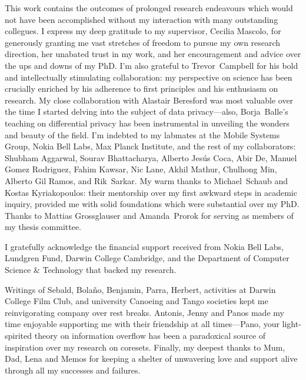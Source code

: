 
\begin{acknowledgements}
This work contains the outcomes of prolonged research endeavours which would not have been accomplished without my interaction with many outstanding collegues. I express my deep gratitude to my supervisor, Cecilia Mascolo, for generously granting me vast stretches of freedom to pursue my own research direction, her unabated trust in my work, and her encouragement and advice over the ups and downs of my PhD. I'm also grateful to \mbox{Trevor Campbell} for his bold and intellectually stimulating collaboration: my perspective on science has been crucially enriched by his adherence to first principles and his enthusiasm on research. My close collaboration with Alastair Beresford was most valuable over the time I started delving into the subject of data privacy---also, \mbox{Borja Balle's} teaching on differential privacy has been instrumental in unveiling the wonders and beauty of the field. I'm indebted to my labmates at the Mobile Systems Group, Nokia Bell Labs, Max Planck Institute, and the rest of my collaborators: Shubham Aggarwal, Sourav Bhattacharya, Alberto Jes\'{u}s Coca, Abir De, Manuel Gomez Rodriguez, Fahim Kawsar, Nic Lane,  Akhil Mathur, Chulhong Min, Alberto Gil Ramos, and \mbox{Rik Sarkar}. My warm thanks to \mbox{Michael Schaub} and Kostas Kyriakopoulos: their mentorship over my first awkward steps in academic inquiry, provided me with solid foundations which were substantial over my PhD. Thanks to Mattias Grossglauser and \mbox{Amanda Prorok} for serving as members of my thesis committee.

I gratefully acknowledge the financial support received from Nokia Bell Labs, Lundgren Fund, Darwin College Cambridge, and the Department of Computer Science \& Technology that backed my research. 

Writings of Sebald, Bola{\~{n}}o, Benjamin, Parra, Herbert, activities at Darwin College Film Club, and university Canoeing and Tango societies kept me reinvigorating company over rest breaks. Antonis, Jenny and Panos made my time enjoyable supporting me with their friendship at all times---Pano, your light-spirited theory on information overflow has been a paradoxical source of inspiration over my research on coresets. Finally, my deepest thanks to Mum, Dad, Lena and Memos for keeping a shelter of unwavering love and support alive through all my successes and failures.
\end{acknowledgements}
